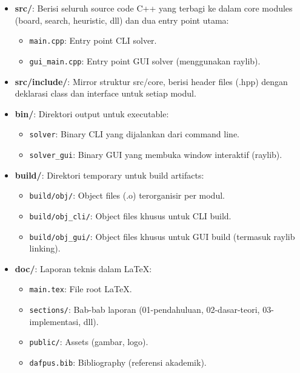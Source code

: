 \begin{itemize}
    \item \textbf{src/}: Berisi seluruh source code C++ yang terbagi ke dalam core modules (board, search, heuristic, dll) dan dua entry point utama:
          \begin{itemize}
              \item \texttt{main.cpp}: Entry point CLI solver.
              \item \texttt{gui\_main.cpp}: Entry point GUI solver (menggunakan raylib).
          \end{itemize}

    \item \textbf{src/include/}: Mirror struktur src/core, berisi header files (.hpp) dengan deklarasi class dan interface untuk setiap modul.

    \item \textbf{bin/}: Direktori output untuk executable:
          \begin{itemize}
              \item \texttt{solver}: Binary CLI yang dijalankan dari command line.
              \item \texttt{solver\_gui}: Binary GUI yang membuka window interaktif (raylib).
          \end{itemize}

    \item \textbf{build/}: Direktori temporary untuk build artifacts:
          \begin{itemize}
              \item \texttt{build/obj/}: Object files (.o) terorganisir per modul.
              \item \texttt{build/obj\_cli/}: Object files khusus untuk CLI build.
              \item \texttt{build/obj\_gui/}: Object files khusus untuk GUI build (termasuk raylib linking).
          \end{itemize}

    \item \textbf{doc/}: Laporan teknis dalam LaTeX:
          \begin{itemize}
              \item \texttt{main.tex}: File root LaTeX.
              \item \texttt{sections/}: Bab-bab laporan (01-pendahuluan, 02-dasar-teori, 03-implementasi, dll).
              \item \texttt{public/}: Assets (gambar, logo).
              \item \texttt{dafpus.bib}: Bibliography (referensi akademik).
          \end{itemize}


\end{itemize}
